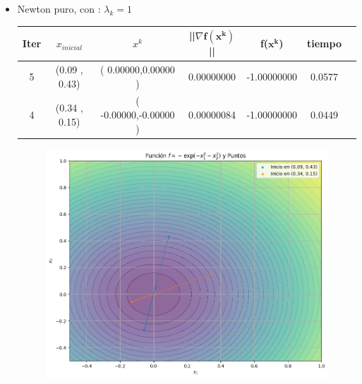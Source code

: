 
\begin{itemize}
    \item Newton puro, con : $\lambda_k = 1$
\begin{table}[H]
\centering
\renewcommand{\arraystretch}{1.2} %
\begin{tabular}{|c|c|c|c|c|c|c|}
\hline
\textbf{Iter} & \textbf{$x_{inicial}$} &\textbf{$x^k$} & \textbf{||$\nabla \mathbf{f(x^k)}$}|| & \textbf{f($\mathbf{x^k}$)} & \textbf{tiempo} \\
\hline
5  &  (0.09 , 0.43) &( 0.00000,0.00000 ) & 0.00000000 & -1.00000000 & 0.0577 \\
4  &  (0.34 , 0.15) &( -0.00000,-0.00000 ) & 0.00000084 & -1.00000000 & 0.0449 \\\hline
\end{tabular}
\end{table}

\begin{figure}
    \centering
    \includegraphics[width=0.65\linewidth]{figuras/PREG5_NEW.png}
    \label{fig:enter-label}
\end{figure}




\end{itemize}
